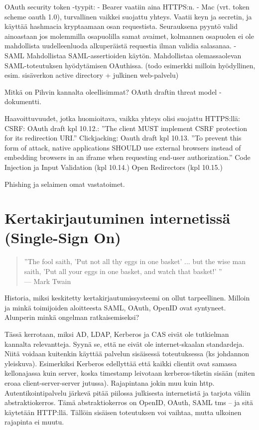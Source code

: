 \documentclass[finnish,gradu]{tktltiki}
\begin{document}
    OAuth security token -tyypit:
    - Bearer vaatiin aina HTTPS:n.
    - Mac (vrt. token scheme oauth 1.0), turvallinen vaikkei suojattu yhteys. Vaatii keyn ja secretin, ja käyttää hashmacia kryptaamaan osan requestista. Seurauksena pyyntö valid ainoastaan jos molemmilla osapuolilla samat avaimet, kolmannen osapuolen ei ole mahdollista uudelleenluoda alkuperäistä requestia ilman validia salasanaa.
    - SAML Mahdollistaa SAML-assertioiden käytön. Mahdollistaa olemassaolevan SAML-toteutuksen hyödytämisen OAuthissa. (todo esimerkki milloin hyödyllinen, esim. sisäverkon active directory + julkinen web-palvelu)

    Mitkä on Pihvin kannalta oleellisimmat?
    OAuth draftin threat model -dokumentti.

    Haavoittuvuudet, jotka huomioitava, vaikka yhteys olisi suojattu HTTPS:llä:
    CSRF: OAuth draft kpl 10.12.: ''The client MUST implement CSRF protection for its redirection URI.''
    Clickjacking: Oauth draft kpl 10.13.
       ''To prevent this form of attack, native applications SHOULD use
       external browsers instead of embedding browsers in an iframe when
       requesting end-user authorization.''
    Code Injection ja Input Validation (kpl 10.14.)
    Open Redirectors (kpl 10.15.)

    Phishing ja selaimen omat vastatoimet.






\section{Kertakirjautuminen internetissä (Single-Sign On)} %
\label{sec:Kertakirjautumisstandardit}
  \begin{quote}
      ''The fool saith, 'Put not all thy eggs in one basket' ...
      but the wise man saith, 'Put all your eggs in one basket, and watch that basket!' ''
      \\--- Mark Twain \cite{twain_eggs_1894}
  \end{quote}

  Historia, miksi keskitetty kertakirjautumissysteemi on ollut tarpeellinen.
  Milloin ja minkä toimijoiden aloitteesta SAML, OAuth, OpenID ovat syntyneet. Alunperin minkä ongelman ratkaisemiseksi?

  Tässä kerrotaan, miksi AD, LDAP, Kerberos ja CAS eivät ole tutkielman kannalta relevantteja. Syynä se, että ne eivät ole internet-skaalan standardeja. Niitä voidaan kuitenkin käyttää palvelun sisäisessä toteutuksessa (ks johdannon yleiskuva). Esimerkiksi Kerberos edellyttää että kaikki clientit ovat samassa kellonajassa kuin server, koska timestamp leivotaan kerberos-tiketin sisään (miten eroaa client-server-server jutussa). Rajapintana jokin muu kuin http. Autentikointipalvelu järkevä pitää piilossa julkisesta internetistä ja tarjota väliin abstraktiokerros. Tämä abstraktiokerros on OpenID, OAuth, SAML tms -- ja sitä käytetään HTTP:llä. Tällöin sisäisen toteutuksen voi vaihtaa, mutta ulkoinen rajapinta ei muutu.
\end{document}

